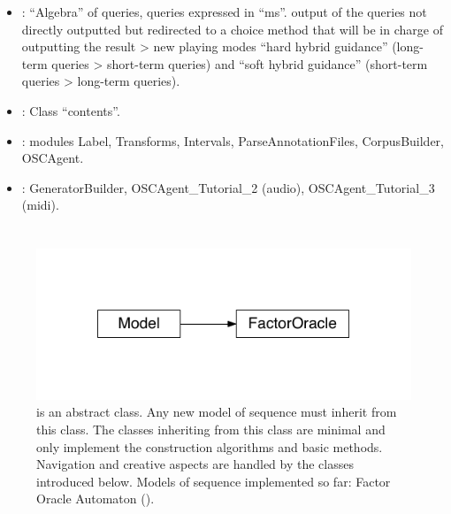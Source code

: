 \documentclass[letterpaper,10pt,english]{sphinxmanual}
\begin{document}
\begin{description}
\begin{itemize}
\item {} 
: “Algebra” of queries, queries expressed in “ms”. output of the queries not directly outputted but redirected to a choice method that will be in charge of outputting the result \textendash{}\textgreater{} new playing modes “hard hybrid guidance” (long-term queries \textgreater{} short-term queries) and “soft hybrid guidance” (short-term queries \textgreater{} long-term queries).

\item {} 
: Class “contents”.

\item {} 
: modules Label, Transforms, Intervals, ParseAnnotationFiles, CorpusBuilder, OSCAgent.

\item {} 
: GeneratorBuilder, OSCAgent\_Tutorial\_2 (audio), OSCAgent\_Tutorial\_3 (midi).

\end{itemize}

\end{description}


\chapter{}
\label{\detokenize{index:overview}}
\begin{figure}[htbp]
\centering
\capstart

\includegraphics{inheritance-425337933f1f8a96ede832a451dc0704d5ae3c99.pdf}
\caption{{\hyperref[\detokenize{index:Model.Model}]{}} is an abstract class. Any new model of sequence must inherit from this class. The classes inheriting from this class are minimal and only implement the construction algorithms and basic methods. Navigation and creative aspects are handled by the classes introduced below. Models of sequence implemented so far: Factor Oracle Automaton ({\hyperref[\detokenize{index:Model.FactorOracle}]{}}).}\label{\detokenize{index:id1}}\end{figure}
\end{document}
